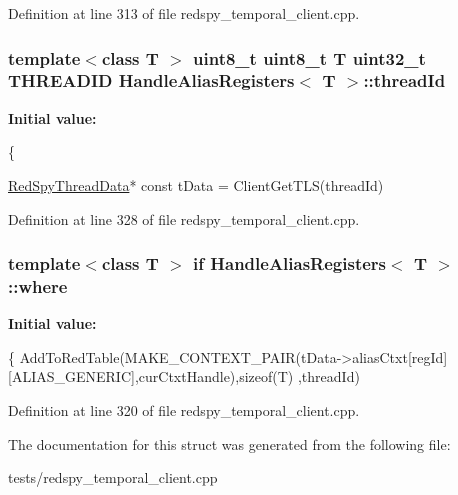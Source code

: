 Definition at line 313 of file redspy\-\_\-temporal\-\_\-client.\-cpp.

\hypertarget{structHandleAliasRegisters_a22a94afb950ba6e6d6c3115f1f8112fd}{
\subsubsection[{thread\-Id}]{\setlength{\rightskip}{0pt plus 5cm}template$<$class T $>$ uint8\-\_\-t uint8\-\_\-t T uint32\-\_\-t T\-H\-R\-E\-A\-D\-I\-D {\bf Handle\-Alias\-Registers}$<$ T $>$\-::thread\-Id}}\label{structHandleAliasRegisters_a22a94afb950ba6e6d6c3115f1f8112fd}
{\bfseries Initial value\-:}
\begin{DoxyCode}
\{
        
        \hyperlink{structRedSpyThreadData}{RedSpyThreadData}* \textcolor{keyword}{const} tData = ClientGetTLS(threadId)
\end{DoxyCode}


Definition at line 328 of file redspy\-\_\-temporal\-\_\-client.\-cpp.

\hypertarget{structHandleAliasRegisters_ac3979af704f5b748a8e63fd476ea16b0}{
\subsubsection[{where}]{\setlength{\rightskip}{0pt plus 5cm}template$<$class T $>$ if {\bf Handle\-Alias\-Registers}$<$ T $>$\-::where}}\label{structHandleAliasRegisters_ac3979af704f5b748a8e63fd476ea16b0}
{\bfseries Initial value\-:}
\begin{DoxyCode}
\{
            AddToRedTable(MAKE\_CONTEXT\_PAIR(tData->aliasCtxt[regId][ALIAS\_GENERIC],curCtxtHandle),\textcolor{keyword}{sizeof}(T)
      ,threadId)
\end{DoxyCode}


Definition at line 320 of file redspy\-\_\-temporal\-\_\-client.\-cpp.



The documentation for this struct was generated from the following file\-:\begin{DoxyCompactItemize}
\item 
tests/redspy\-\_\-temporal\-\_\-client.\-cpp\end{DoxyCompactItemize}
